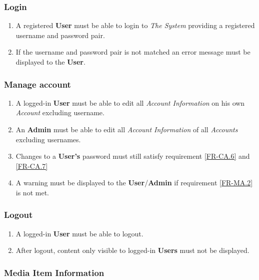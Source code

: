 \subsubsection {Login}
	
\begin{enumerate}[label=FR-\twodigits*, resume]
	\item A registered \textbf{User} must be able to login to \textit{The System} providing a registered username and password pair.
	\item If the username and password pair is not matched an error message must be displayed to the \textbf{User}. 
\end{enumerate}
		
\subsubsection {Manage account}

\begin{enumerate}[label=FR-\twodigits*, resume]
	\item A logged-in \textbf{User} must be able to edit all \textit{Account Information} on his own \textit{Account} excluding username.
	\item An \textbf{Admin} must be able to edit all \textit{Account Information} of all \textit{Accounts} excluding usernames.
	\item Changes to a \textbf{User's} password must still satisfy requirement \ref{FR-CA.6} and \ref{FR-CA.7} \label{FR-MA.2}
	\item A warning must be displayed to the \textbf{User}/\textbf{Admin} if requirement \ref{FR-MA.2} is not met.	
\end{enumerate}
		
\subsubsection {Logout}
\begin{enumerate}[label=FR-\twodigits*, resume]
	\item A logged-in \textbf{User} must be able to logout.
	\item After logout, content only visible to logged-in \textbf{Users} must not be displayed.
\end{enumerate}
	
\subsubsection {Media Item Information} \label{FR-Media}


